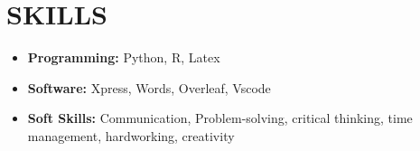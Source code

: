 \documentclass[a4paper,9pt]{extarticle}
\begin{document}
\section*{SKILLS}
\begin{itemize}
    \item \textbf{Programming:} Python, R, Latex
    \item \textbf{Software:} Xpress, Words, Overleaf, Vscode
    \item \textbf{Soft Skills:} Communication, Problem-solving, critical thinking, time management, hardworking, creativity
\end{itemize}

\end{document}
